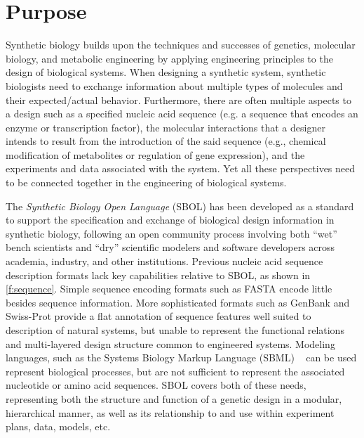 \section{Purpose}

Synthetic biology builds upon the techniques and successes of genetics, molecular biology, and metabolic engineering by applying engineering principles to the design of biological systems. 
When designing a synthetic system, synthetic biologists need to exchange information about multiple types of molecules and their expected/actual behavior.
Furthermore, there are often multiple aspects to a design such as a specified nucleic acid sequence (e.g. a sequence that encodes an enzyme or transcription factor), the molecular interactions that a designer intends to result from the introduction of the said sequence (e.g., chemical modification of metabolites or regulation of gene expression), and the experiments and data associated with the system. Yet all these perspectives need to be connected together in the engineering of biological systems.

The \emph{Synthetic Biology Open Language} (SBOL) has been developed as a standard to support the specification and exchange of biological design information in synthetic biology, 
following an open community process involving both ``wet'' bench scientists and ``dry'' scientific modelers and software developers across academia, industry, and other institutions.
Previous nucleic acid sequence description formats lack key capabilities relative to SBOL, as shown in \ref{f:sequence}. 
Simple sequence encoding formats such as FASTA encode little besides sequence information. 
More sophisticated formats such as GenBank and Swiss-Prot provide a flat annotation of sequence features well suited to description of natural systems, but unable to represent the functional relations and multi-layered design structure common to engineered systems.
Modeling languages, such as the Systems Biology Markup Language (SBML) ~\cite{SBML} can be used represent biological processes, but are not sufficient to represent the associated nucleotide or amino acid sequences.  
SBOL covers both of these needs, representing both the structure and function of a genetic design in a modular, hierarchical manner, as well as its relationship to and use within experiment plans, data, models, etc.


